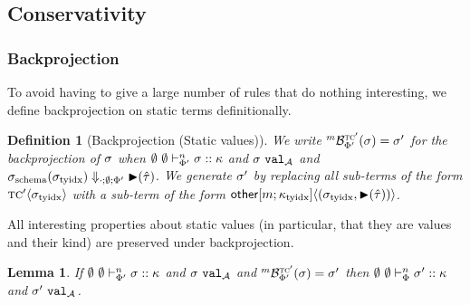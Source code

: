 \documentclass[12pt]{article}
\newtheorem{theorem}{Theorem}
\newtheorem{lemma}{Lemma}
\newtheorem{definition}{Definition}
\begin{document}



\subsection{Conservativity}
\subsubsection{Backprojection}
To avoid having to give a large number of rules that do nothing interesting, we define backprojection on static terms definitionally.



\begin{definition}[Backprojection (Static values)]
We write ${}^{m}\mathcal{B}_{\Phi'}^{\textsc{tc}'}(\sigma)=\sigma'$ for the backprojection of $\sigma$ when $\emptyset~\emptyset \vdash_{\Phi'}^{n} \sigma :: \kappa$ and $\sigma~\mathtt{val}_{\mathcal{A}}$ and $\sigma_\text{schema}(\sigma_\text{tyidx}) \Downarrow_{\cdot;\emptyset;\Phi'} {\blacktriangleright}(\hat{\tau})$. We generate $\sigma'$ by replacing all sub-terms of the form ${\textsc{tc}'}\langle\sigma_\text{tyidx}\rangle$ with a sub-term of the form ${{\sf other}[m; \kappa_\text{tyidx}]}\langle(\sigma_\text{tyidx}, {\blacktriangleright}(\hat{\tau}))\rangle$. 
\end{definition}

All interesting properties about static values (in particular, that they are values and their kind) are preserved under backprojection.

\begin{lemma}
If $\emptyset~\emptyset \vdash_{\Phi'}^{n} \sigma :: \kappa$ and $\sigma~\mathtt{val}_{\mathcal{A}}$ and ${}^{m}\mathcal{B}_{\Phi'}^{\textsc{tc}'}(\sigma)=\sigma'$ then $\emptyset~\emptyset \vdash_{\Phi}^{n} \sigma' :: \kappa$ and $\sigma'~\mathtt{val}_{\mathcal{A}}$.
\end{lemma}
\end{document}
